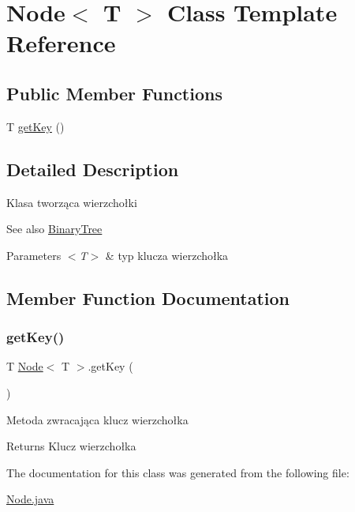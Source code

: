 \hypertarget{classNode}{}\section{Node$<$ T $>$ Class Template Reference}
\label{classNode}
\subsection*{Public Member Functions}
\begin{DoxyCompactItemize}
\item 
T \hyperlink{classNode_af167662ac03e7f140d61aaaaae9d5aee}{get\+Key} ()
\end{DoxyCompactItemize}


\subsection{Detailed Description}
Klasa tworząca wierzchołki \begin{DoxySeeAlso}{See also}
\hyperlink{classBinaryTree}{Binary\+Tree} 
\end{DoxySeeAlso}

\begin{DoxyParams}{Parameters}
{\em $<$\+T$>$} & typ klucza wierzchołka \\
\hline
\end{DoxyParams}


\subsection{Member Function Documentation}
\mbox{\label{classNode_af167662ac03e7f140d61aaaaae9d5aee}} 
\subsubsection{\texorpdfstring{get\+Key()}{getKey()}}
{\footnotesize\ttfamily T \hyperlink{classNode}{Node}$<$ T $>$.get\+Key (\begin{DoxyParamCaption}{ }\end{DoxyParamCaption})\hspace{0.3cm}{\ttfamily [inline]}}

Metoda zwracająca klucz wierzchołka \begin{DoxyReturn}{Returns}
Klucz wierzchołka 
\end{DoxyReturn}


The documentation for this class was generated from the following file\+:\begin{DoxyCompactItemize}
\item 
\hyperlink{Node_8java}{Node.\+java}\end{DoxyCompactItemize}
